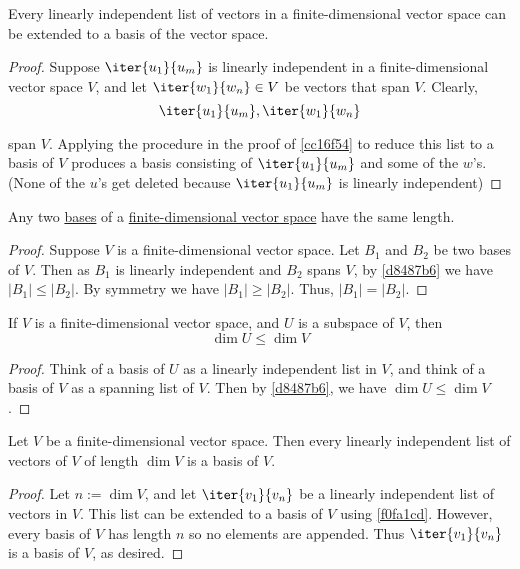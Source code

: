\label{f0fa1cd}

Every linearly independent list of vectors in a finite-dimensional vector space
can be extended to a basis of the vector space.

\begin{proof}
  Suppose $\iter{u_1}{u_m}$ is linearly independent in a finite-dimensional
  vector space $V$, and let $\iter{w_1}{w_n}\in V$ be vectors that span $V$.
  Clearly,
  $$
    \iter{u_1}{u_m},\iter{w_1}{w_n}
  $$

  span $V$. Applying the procedure in the proof of \autoref{cc16f54} to reduce
  this list to a basis of $V$ produces a basis consisting of $\iter{u_1}{u_m}$
  and some of the $w$'s. (None of the $u$'s get deleted because
  $\iter{u_1}{u_m}$ is linearly independent)
\end{proof}

\label{c1f28cf}

Any two \href{db2477b}{bases} of a \href{c4cd6dd}{finite-dimensional vector
space} have the same length.

\begin{proof}
  Suppose $V$ is a finite-dimensional vector space. Let $B_1$ and $B_2$ be two
  bases of $V$. Then as $B_1$ is linearly independent and $B_2$ spans $V$, by
  \autoref{d8487b6} we have $|B_1|\leq|B_2|$. By symmetry we have
  $|B_1|\geq|B_2|$. Thus, $|B_1|=|B_2|$.
\end{proof}

\label{bf6aad4}

If $V$ is a finite-dimensional vector space, and $U$ is a subspace of $V$, then
$$
  \dim U\leq\dim V
$$

\begin{proof}
  Think of a basis of $U$ as a linearly independent list in $V$, and think of a
  basis of $V$ as a spanning list of $V$. Then by \autoref{d8487b6}, we have
  $\dim U\leq\dim V$.
\end{proof}

\label{e3d5b2a}

Let $V$ be a finite-dimensional vector space. Then every linearly independent
list of vectors of $V$ of length $\dim V$ is a basis of $V$.

\begin{proof}
  Let $n:=\dim V$, and let $\iter{v_1}{v_n}$ be a linearly independent list of
  vectors in $V$. This list can be extended to a basis of $V$ using
  \autoref{f0fa1cd}. However, every basis of $V$ has length $n$ so no elements
  are appended. Thus $\iter{v_1}{v_n}$ is a basis of $V$, as desired.
\end{proof}

